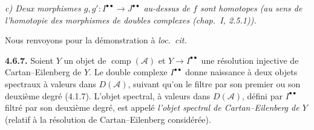 \noindent\textit{c) Deux morphismes
$g,g'\colon I^{\bullet\bullet}\longrightarrow J^{\bullet\bullet}$
au-dessus de $f$ sont homotopes (au sens de l'homotopie des morphismes de
doubles complexes (chap.~I, 2.5.1)).}

Nous renvoyons pour la démonstration à \emph{loc.\ cit.}

\medskip\noindent\textbf{4.6.7.}\quad
Soient $Y$ un objet de $\operatorname{comp}(\mathcal A)$ et
$Y\longrightarrow I^{\bullet\bullet}$ une résolution injective de
Cartan--Eilenberg de $Y$. Le double complexe $I^{\bullet\bullet}$ donne
naissance à deux objets spectraux à valeurs dans $D(\mathcal A)$, suivant
qu'on le filtre par son premier ou son deuxième degré (4.1.7). L'objet
spectral, à valeurs dans $D(\mathcal A)$, défini par
$I^{\bullet\bullet}$ filtré par son deuxième degré, est appelé
\emph{l'objet spectral de Cartan--Eilenberg de $Y$} (relatif à la
résolution de Cartan--Eilenberg considérée).
\endgroup

